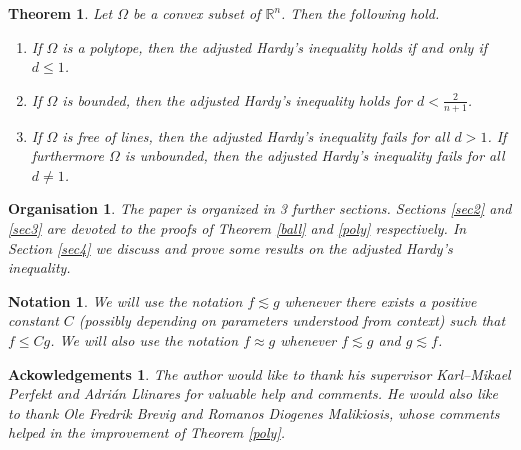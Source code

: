 \documentclass[footinclude=true]{amsart}
\theoremstyle{plain}
\newtheorem{theo}{Theorem}[section]
\newtheorem*{ack}{Ackowledgements}
\newtheorem*{notat}{Notation}
\newtheorem*{Organisation}{Organisation}
\begin{document}
	\begin{theo}\label{theo3}
		Let $\Omega$ be a convex subset of $\mathbb{R}^{n}$. Then the following hold.
		\begin{enumerate}
			\item If $\Omega$ is a polytope, then the adjusted Hardy's inequality holds if and only if $d\leq 1$.
			\item If $\Omega$ is bounded, then the adjusted Hardy's inequality holds for $d<\frac{2}{n+1}$.
			\item If $\Omega$ is free of lines, then the adjusted Hardy's inequality fails for all $d>1$. If furthermore $\Omega$ is unbounded, then the adjusted Hardy's inequality fails for all $d\neq 1$.
		\end{enumerate}
	\end{theo}
	\begin{Organisation}
		The paper is organized in 3 further sections. Sections \ref{sec2} and \ref{sec3} are devoted to the proofs of Theorem \ref{ball} and \ref{poly} respectively. In Section \ref{sec4} we discuss and prove some results on the adjusted Hardy's inequality.
	\end{Organisation}
	\begin{notat}
		We will use the notation $f\lesssim g$ whenever there exists a positive constant $C$ (possibly depending on parameters understood from context) such that $f\leq Cg$. We will also use the notation $f\approx g$ whenever $f\lesssim g$ and $g\lesssim f$.
	\end{notat}
	\begin{ack}
		The author would like to thank his supervisor Karl--Mikael Perfekt and Adri\'an Llinares for valuable help and comments. He would also like to thank Ole Fredrik Brevig and Romanos Diogenes Malikiosis, whose comments helped in the improvement of Theorem \ref{poly}.
	\end{ack}
\end{document}
